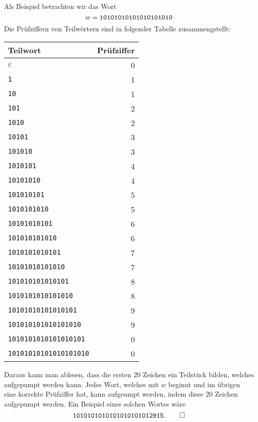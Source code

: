 \begin{loesung}
Als Beispiel betrachten wir das Wort
\[
w=\text{\tt 10101010101010101010}
\]
Die Prüfziffern von Teilwörtern sind in folgender Tabelle
zusammengstellt:
\begin{center}
\begin{tabular}{|l|r|}
\hline
Teilwort&Prüfziffer\\
\hline
$\varepsilon$             &0\\
{\tt 1}                   &1\\
{\tt 10}                  &1\\
{\tt 101}                 &2\\
{\tt 1010}                &2\\
{\tt 10101}               &3\\
{\tt 101010}              &3\\
{\tt 1010101}             &4\\
{\tt 10101010}            &4\\
{\tt 101010101}           &5\\
{\tt 1010101010}          &5\\
{\tt 10101010101}         &6\\
{\tt 101010101010}        &6\\
{\tt 1010101010101}       &7\\
{\tt 10101010101010}      &7\\
{\tt 101010101010101}     &8\\
{\tt 1010101010101010}    &8\\
{\tt 10101010101010101}   &9\\
{\tt 101010101010101010}  &9\\
{\tt 1010101010101010101} &0\\
{\tt 10101010101010101010}&0\\
\hline
\end{tabular}
\end{center}
Daraus kann man ablesen, dass die ersten 20 Zeichen ein Teilstück
bilden, welches aufgepumpt werden kann. Jedes Wort, welches mit
$w$ beginnt und im übrigen eine korrekte Prüfziffer hat, kann
aufgeumpt werden, indem diese 20 Zeichen aufgepumpt werden.
Ein Beispiel eines solchen Wortes wäre
\[
\text{\tt 1010101010101010101012915}.
\qedhere
\]
\end{loesung}
